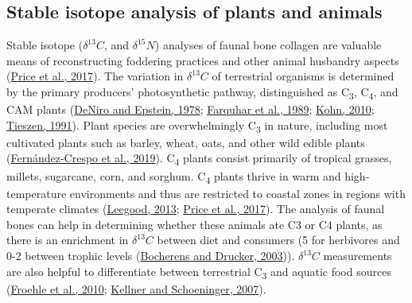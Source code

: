 \documentclass[3p]{elsarticle} %
\begin{document}
\hypertarget{stable-isotope-analysis-of-plants-and-animals}{%
\subsection{Stable isotope analysis of plants and animals}\label{stable-isotope-analysis-of-plants-and-animals}}

Stable isotope (\(\delta ^{13}C\), and \(\delta ^{15}N\)) analyses of faunal bone collagen are valuable means of reconstructing foddering practices and other animal husbandry aspects (\protect\hyperlink{ref-price_etal17}{Price et al., 2017}). The variation in \(\delta ^{13}C\) of terrestrial organisms is determined by the primary producers' photosynthetic pathway, distinguished as C\textsubscript{3}, C\textsubscript{4}, and CAM plants (\protect\hyperlink{ref-deniro_epstein78}{DeNiro and Epstein, 1978}; \protect\hyperlink{ref-farquhar_etal89}{Farquhar et al., 1989}; \protect\hyperlink{ref-kohn10}{Kohn, 2010}; \protect\hyperlink{ref-tieszen91}{Tieszen, 1991}). Plant species are overwhelmingly C\textsubscript{3} in nature, including most cultivated plants such as barley, wheat, oats, and other wild edible plants (\protect\hyperlink{ref-fernandez-crespo_etal19}{Fernández-Crespo et al., 2019}). C\textsubscript{4} plants consist primarily of tropical grasses, millets, sugarcane, corn, and sorghum. C\textsubscript{4} plants thrive in warm and high-temperature environments and thus are restricted to coastal zones in regions with temperate climates (\protect\hyperlink{ref-leegood13}{Leegood, 2013}; \protect\hyperlink{ref-price_etal17}{Price et al., 2017}). The analysis of faunal bones can help in determining whether these animals ate C3 or C4 plants, as there is an enrichment in \(\delta ^{13}C\) between diet and consumers (5\text{\textperthousand} for herbivores and 0-2\text{\textperthousand} between trophic levels (\protect\hyperlink{ref-bocherens_drucker03}{Bocherens and Drucker, 2003})). \(\delta ^{13}C\) measurements are also helpful to differentiate between terrestrial C\textsubscript{3} and aquatic food sources (\protect\hyperlink{ref-froehle_etal10}{Froehle et al., 2010}; \protect\hyperlink{ref-kellner_schoeninger07}{Kellner and Schoeninger, 2007}).
\end{document}
